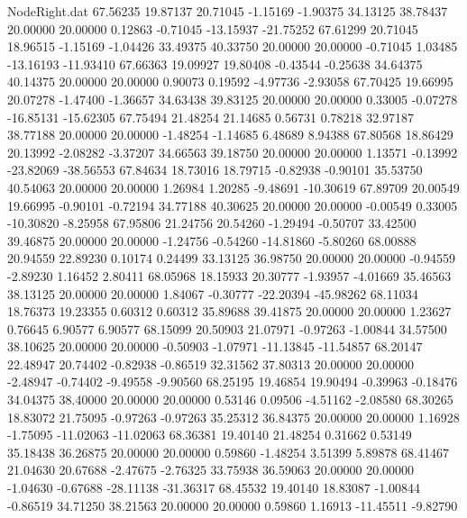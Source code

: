 \begin{filecontents}{NodeRight.dat}
  67.56235   19.87137   20.71045    -1.15169   -1.90375   34.13125   38.78437   20.00000   20.00000    0.12863   -0.71045  -13.15937  -21.75252
  67.61299   20.71045   18.96515    -1.15169   -1.04426   33.49375   40.33750   20.00000   20.00000   -0.71045    1.03485  -13.16193  -11.93410
  67.66363   19.09927   19.80408    -0.43544   -0.25638   34.64375   40.14375   20.00000   20.00000    0.90073    0.19592   -4.97736   -2.93058
  67.70425   19.66995   20.07278    -1.47400   -1.36657   34.63438   39.83125   20.00000   20.00000    0.33005   -0.07278  -16.85131  -15.62305
  67.75494   21.48254   21.14685     0.56731    0.78218   32.97187   38.77188   20.00000   20.00000   -1.48254   -1.14685    6.48689    8.94388
  67.80568   18.86429   20.13992    -2.08282   -3.37207   34.66563   39.18750   20.00000   20.00000    1.13571   -0.13992  -23.82069  -38.56553
  67.84634   18.73016   18.79715    -0.82938   -0.90101   35.53750   40.54063   20.00000   20.00000    1.26984    1.20285   -9.48691  -10.30619
  67.89709   20.00549   19.66995    -0.90101   -0.72194   34.77188   40.30625   20.00000   20.00000   -0.00549    0.33005  -10.30820   -8.25958
  67.95806   21.24756   20.54260    -1.29494   -0.50707   33.42500   39.46875   20.00000   20.00000   -1.24756   -0.54260  -14.81860   -5.80260
  68.00888   20.94559   22.89230     0.10174    0.24499   33.13125   36.98750   20.00000   20.00000   -0.94559   -2.89230    1.16452    2.80411
  68.05968   18.15933   20.30777    -1.93957   -4.01669   35.46563   38.13125   20.00000   20.00000    1.84067   -0.30777  -22.20394  -45.98262
  68.11034   18.76373   19.23355     0.60312    0.60312   35.89688   39.41875   20.00000   20.00000    1.23627    0.76645    6.90577    6.90577
  68.15099   20.50903   21.07971    -0.97263   -1.00844   34.57500   38.10625   20.00000   20.00000   -0.50903   -1.07971  -11.13845  -11.54857
  68.20147   22.48947   20.74402    -0.82938   -0.86519   32.31562   37.80313   20.00000   20.00000   -2.48947   -0.74402   -9.49558   -9.90560
  68.25195   19.46854   19.90494    -0.39963   -0.18476   34.04375   38.40000   20.00000   20.00000    0.53146    0.09506   -4.51162   -2.08580
  68.30265   18.83072   21.75095    -0.97263   -0.97263   35.25312   36.84375   20.00000   20.00000    1.16928   -1.75095  -11.02063  -11.02063
  68.36381   19.40140   21.48254     0.31662    0.53149   35.18438   36.26875   20.00000   20.00000    0.59860   -1.48254    3.51399    5.89878
  68.41467   21.04630   20.67688    -2.47675   -2.76325   33.75938   36.59063   20.00000   20.00000   -1.04630   -0.67688  -28.11138  -31.36317
  68.45532   19.40140   18.83087    -1.00844   -0.86519   34.71250   38.21563   20.00000   20.00000    0.59860    1.16913  -11.45511   -9.82790

\end{filecontents}

